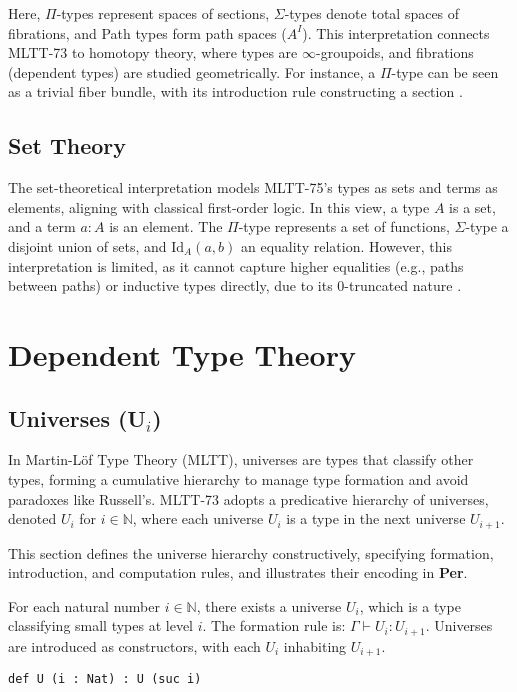 \documentclass{article}
\begin{document}
Here, $\Pi$-types represent spaces of sections, $\Sigma$-types denote
total spaces of fibrations, and Path types form path spaces ($A^I$).
This interpretation connects MLTT-73 to homotopy theory, where types
are $\infty$-groupoids, and fibrations (dependent types) are studied
geometrically. For instance, a $\Pi$-type can be seen as a trivial fiber
bundle, with its introduction rule constructing a section \cite{HoTT13}.

\subsection*{Set Theory}

The set-theoretical interpretation models MLTT-75’s types as sets and
terms as elements, aligning with classical first-order logic. In this
view, a type $A$ is a set, and a term $a : A$ is an element. The $\Pi$-type
represents a set of functions, $\Sigma$-type a disjoint union of sets,
and $\text{Id}_A(a, b)$ an equality relation. However, this interpretation
is limited, as it cannot capture higher equalities (e.g., paths between paths)
or inductive types directly, due to its 0-truncated nature \cite{HoTT13}.

\section{Dependent Type Theory}


\subsection{Universes (U$_i$)}
In Martin-Löf Type Theory (MLTT), universes are types that classify other types,
forming a cumulative hierarchy to manage type formation and avoid paradoxes like
Russell’s. MLTT-73 adopts a predicative hierarchy
of universes, denoted \( U_i \) for \( i \in \mathbb{N} \), where each
universe \( U_i \) is a type in the next universe \( U_{i+1} \).

This section defines the universe hierarchy constructively,
specifying formation, introduction, and computation rules,
and illustrates their encoding in \textbf{Per}.

\begin{definition}
For each natural number \( i \in \mathbb{N} \), there exists a universe \( U_i \), which is a type classifying small types at level \( i \). The formation rule is:
$\Gamma \vdash U_i : U_{i+1}$.
Universes are introduced as constructors, with each \( U_i \) inhabiting \( U_{i+1} \).
\begin{lstlisting}[mathescape=true]
def U (i : Nat) : U (suc i)
\end{lstlisting}
\end{definition}
\end{document}
